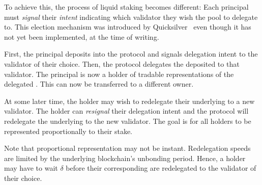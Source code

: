 To achieve this, the process of liquid
staking becomes different: Each principal must \emph{signal} their
\emph{intent} indicating which validator they wish
the pool to delegate to. This election mechanism was introduced by
Quicksilver~\cite{quicksilver} even though it has not yet been implemented,
at the time of writing.

First, the principal deposits \asset into the protocol and signals
delegation intent to the validator of their choice. Then, the protocol
delegates the deposited \asset to that validator. The principal is
now a holder of tradable \stasset representations of the delegated \asset.
This \stasset can now be transferred to a different owner.

At some later time, the \stasset holder may wish to redelegate
their underlying \asset to a new validator.
The \stasset holder can \emph{resignal} their delegation intent and the protocol
will redelegate the underlying \asset to the new validator.
The goal is for all \stasset holders to be represented proportionally to
their stake.

Note that proportional representation may not be instant. Redelegation speeds
are limited by the underlying blockchain's unbonding period.
Hence, a \stasset holder may have to wait $\delta$ before their corresponding
\assets are redelegated to the validator of their choice.

